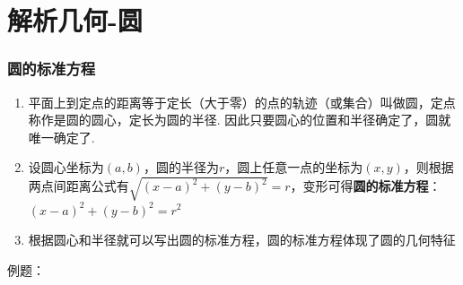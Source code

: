\chapter*{解析几何-圆}
\subsection*{圆的标准方程}
\begin{enumerate}
    \item 平面上到定点的距离等于定长（大于零）的点的轨迹（或集合）叫做圆，定点称作是圆的圆心，定长为圆的半径. 因此只要圆心的位置和半径确定了，圆就唯一确定了.
    \item 设圆心坐标为$(a, b)$，圆的半径为$r$，圆上任意一点的坐标为$(x, y)$，则根据两点间距离公式有$\sqrt{(x-a)^2 + (y-b)^2} = r$，变形可得\textbf{圆的标准方程}：$(x-a)^2 + (y-b)^2 = r^2$
    \item 根据圆心和半径就可以写出圆的标准方程，圆的标准方程体现了圆的几何特征
\end{enumerate}
例题：
